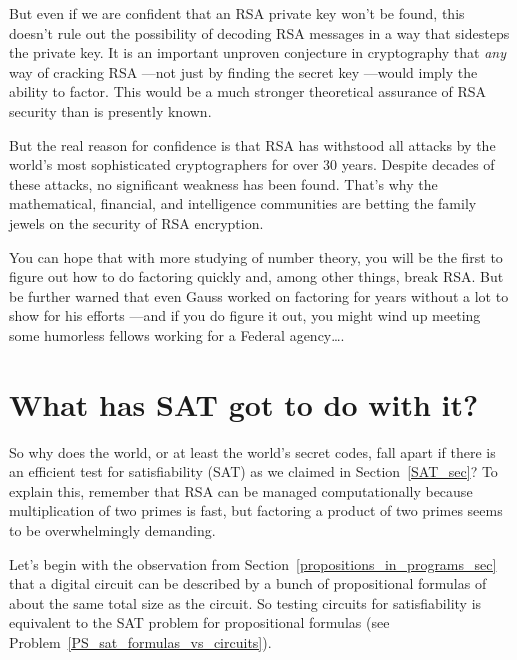 But even if we are confident that an RSA private key won't be found,
this doesn't rule out the possibility of decoding RSA messages in a
way that sidesteps the private key.  It is an important unproven
conjecture in cryptography that \emph{any} way of cracking RSA ---not
just by finding the secret key ---would imply the ability to factor.
This would be a much stronger theoretical assurance of RSA security
than is presently known.

But the real reason for confidence is that RSA has withstood all
attacks by the world's most sophisticated cryptographers for over 30
years.  Despite decades of these attacks, no significant weakness has
been found.  That's why the mathematical, financial, and intelligence
communities are betting the family jewels on the security of RSA
encryption.

You can hope that with more studying of number theory, you will be the
first to figure out how to do factoring quickly and, among other
things, break RSA.  But be further warned that even Gauss worked on
factoring for years without a lot to show for his efforts ---and if
you do figure it out, you might wind up meeting some humorless fellows
working for a Federal agency\dots.

\begin{problems}
\practiceproblems
{}

\classproblems
{}

\homeworkproblems
{}
\end{problems}

\section{What has SAT got to do with it?}\label{SAT_RSA_sec}
So why does the world, or at least the world's secret codes, fall
apart if there is an efficient test for satisfiability (SAT) as we
claimed in Section~\ref{SAT_sec}?  To explain this, remember that RSA
can be managed computationally because multiplication of two primes is
fast, but factoring a product of two primes seems to be overwhelmingly
demanding.

Let's begin with the observation from
Section~\ref{propositions_in_programs_sec} that a digital circuit can
be described by a bunch of propositional formulas of about the same
total size as the circuit.  So testing circuits for satisfiability is
equivalent to the SAT problem for propositional formulas (see
Problem~\ref{PS_sat_formulas_vs_circuits}).


